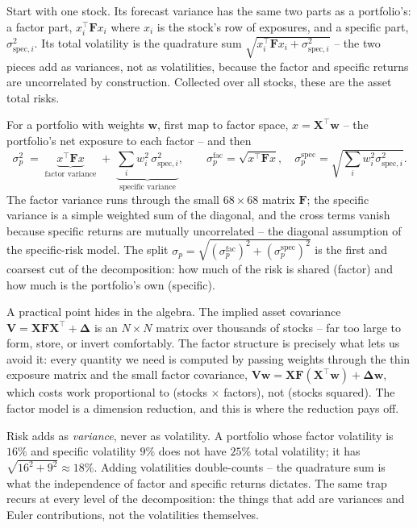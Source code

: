 \documentclass[11pt]{article}
\theoremstyle{definition}
\theoremstyle{plain}
\theoremstyle{remark}
\newcommand{\T}{^{\!\top}}
\newcommand{\wvec}{\mathbf{w}}
\newcommand{\Xmat}{\mathbf{X}}
\newcommand{\Fmat}{\mathbf{F}}
\newcommand{\Vmat}{\mathbf{V}}
\newcommand{\Del}{\boldsymbol{\Delta}}
\begin{document}
Start with one stock. Its forecast variance has the same two parts as a portfolio's: a factor part, $x_i\T\Fmat x_i$ where $x_i$ is the stock's row of exposures, and a specific part, $\sigma_{\text{spec},i}^2$. Its total volatility is the quadrature sum $\sqrt{x_i\T\Fmat x_i + \sigma_{\text{spec},i}^2}$ -- the two pieces add as variances, not as volatilities, because the factor and specific returns are uncorrelated by construction. Collected over all stocks, these are the asset total risks.

For a portfolio with weights $\wvec$, first map to factor space, $x=\Xmat\T\wvec$ -- the portfolio's net exposure to each factor -- and then
\[
\sigma_p^2 \;=\; \underbrace{x\T\Fmat x}_{\text{factor variance}} \;+\; \underbrace{\textstyle\sum_i w_i^2\,\sigma_{\text{spec},i}^2}_{\text{specific variance}},
\qquad
\sigma_p^{\text{fac}}=\sqrt{x\T\Fmat x},\quad
\sigma_p^{\text{spec}}=\sqrt{\textstyle\sum_i w_i^2\sigma_{\text{spec},i}^2}.
\]
The factor variance runs through the small $68\times68$ matrix $\Fmat$; the specific variance is a simple weighted sum of the diagonal, and the cross terms vanish because specific returns are mutually uncorrelated -- the diagonal assumption of the specific-risk model. The split $\sigma_p = \sqrt{(\sigma_p^{\text{fac}})^2 + (\sigma_p^{\text{spec}})^2}$ is the first and coarsest cut of the decomposition: how much of the risk is shared (factor) and how much is the portfolio's own (specific).

A practical point hides in the algebra. The implied asset covariance $\Vmat = \Xmat\Fmat\Xmat\T + \Del$ is an $N\times N$ matrix over thousands of stocks -- far too large to form, store, or invert comfortably. The factor structure is precisely what lets us avoid it: every quantity we need is computed by passing weights through the thin exposure matrix and the small factor covariance, $\Vmat\wvec = \Xmat\Fmat(\Xmat\T\wvec) + \Del\wvec$, which costs work proportional to (stocks $\times$ factors), not (stocks squared). The factor model is a dimension reduction, and this is where the reduction pays off.

\begin{pitfall}
Risk adds as \emph{variance}, never as volatility. A portfolio whose factor volatility is $16\%$ and specific volatility $9\%$ does not have $25\%$ total volatility; it has $\sqrt{16^2+9^2}\approx 18\%$. Adding volatilities double-counts -- the quadrature sum is what the independence of factor and specific returns dictates. The same trap recurs at every level of the decomposition: the things that add are variances and Euler contributions, not the volatilities themselves.
\end{pitfall}
\end{document}
